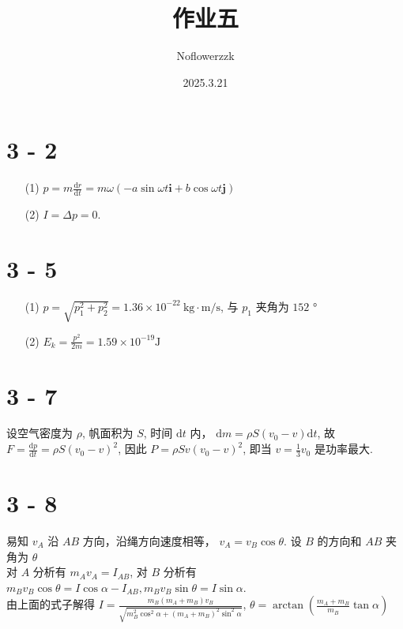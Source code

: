 \documentclass{article}
\title{作业五}
\author{Noflowerzzk}
\date{2025.3.21}
\newcommand{\dd}{\mathrm{d}}
\newcommand{\kgmps}{\ \mathrm{kg \cdot m / s}}
\begin{document}
\maketitle

\section*{3 - 2}

\begin{itemize}
    \item [(1)] $p = m \frac{\dd r}{\dd t} = m\omega (-a\sin \omega t \boldsymbol{i} + b \cos \omega t \boldsymbol{j})$
    \item [(2)] $I = \Delta p = 0$. 
\end{itemize}

\section*{3 - 5}

\begin{itemize}
    \item [(1)] $p = \sqrt{p_1^2 + p_2^2} = 1.36 \times 10^{-22} \kgmps$, 与 $p_1$ 夹角为 $152$ °
    \item [(2)] $E_k = \frac{p^2}{2m} = 1.59 \times 10^{-19} \mathrm{J}$
\end{itemize}

\section*{3 - 7}

设空气密度为 $\rho$, 帆面积为 $S$, 时间 $\dd t$ 内， $\dd m = \rho S(v_0 - v)\dd t$, 故 $F = \frac{\dd p}{\dd t} = \rho S (v_0 - v)^2$, 因此 $P = \rho S v (v_0 - v)^2$, 即当 $v = \frac{1}{3}v_0$ 是功率最大.

\section*{3 - 8}

易知 $v_A$ 沿 $AB$ 方向，沿绳方向速度相等， $v_A = v_B\cos \theta$. 设 $B$ 的方向和 $AB$ 夹角为 $\theta$ \\
对 $A$ 分析有 $m_Av_A = I_{AB}$, 对 $B$ 分析有 $m_Bv_B\cos \theta = I\cos \alpha - I_{AB}, m_Bv_B\sin \theta = I\sin \alpha$. \\
由上面的式子解得 $I = \frac{m_B(m_A + m_B)v_B}{\sqrt{m_B^2 \cos^2 \alpha + (m_A + m_B)^2\sin^2 \alpha}}$, $\theta = \arctan \left(\frac{m_A + m_B}{m_B}\tan \alpha\right)$
\end{document}
